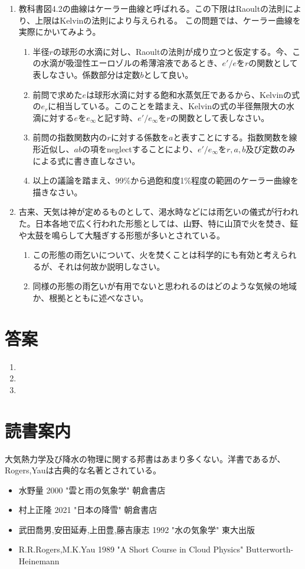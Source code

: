 \documentclass{jsarticle}
\newenvironment{problems}
{
  \renewcommand\labelenumi{\doublebox{\arabic{enumi}}}
  \begin{enumerate}
}{
  \end{enumerate}
  \renewcommand\labelenumi{\arabic{enumi}.}
}
\begin{document}
\begin{problems}
    \item 教科書図4.2の曲線はケーラー曲線と呼ばれる。この下限はRaoultの法則により、上限はKelvinの法則により与えられる。
        この問題では、ケーラー曲線を実際にかいてみよう。
        \begin{enumerate}[(1)]
        \item 半径$r$の球形の水滴に対し、Raoultの法則が成り立つと仮定する。今、この水滴が吸湿性エーロゾルの希薄溶液であるとき、$e'/e$を$r$の関数として表しなさい。係数部分は定数$b$として良い。
        \item 前問で求めた$e$は球形水滴に対する飽和水蒸気圧であるから、Kelvinの式の$e_r$に相当している。このことを踏まえ、Kelvinの式の半径無限大の水滴に対する$e$を$e_\infty$と記す時、$e'/e_\infty$を$r$の関数として表しなさい。
        \item 前問の指数関数内の$r$に対する係数を$a$と表すことにする。指数関数を線形近似し、$ab$の項をneglectすることにより、$e'/e_\infty$を$r,a,b$及び定数のみによる式に書き直しなさい。
        \item 以上の議論を踏まえ、99\%から過飽和度1\%程度の範囲のケーラー曲線を描きなさい。\\
        \end{enumerate}

    \item 古来、天気は神が定めるものとして、渇水時などには雨乞いの儀式が行われた。日本各地で広く行われた形態としては、山野、特に山頂で火を焚き、鉦や太鼓を鳴らして大騒ぎする形態が多いとされている。
        \begin{enumerate}[(1)]
        \item この形態の雨乞いについて、火を焚くことは科学的にも有効と考えられるが、それは何故か説明しなさい。
        \item 同様の形態の雨乞いが有用でないと思われるのはどのような気候の地域か、根拠とともに述べなさい。
        \end{enumerate}

\end{problems}

\section{答案}
\begin{problems}
\item 

\item 

\item 

\end{problems}

\section{読書案内}
大気熱力学及び降水の物理に関する邦書はあまり多くない。洋書であるが、Rogers,Yauは古典的な名著とされている。
\begin{itemize}
\item 水野量 2000 "雲と雨の気象学" 朝倉書店
\item 村上正隆 2021 "日本の降雪" 朝倉書店
\item 武田喬男,安田延寿,上田豊,藤吉康志 1992 "水の気象学" 東大出版
\item R.R.Rogers,M.K.Yau 1989 "A Short Course in Cloud Physics" Butterworth-Heinemann
\end{itemize}
\end{document}
